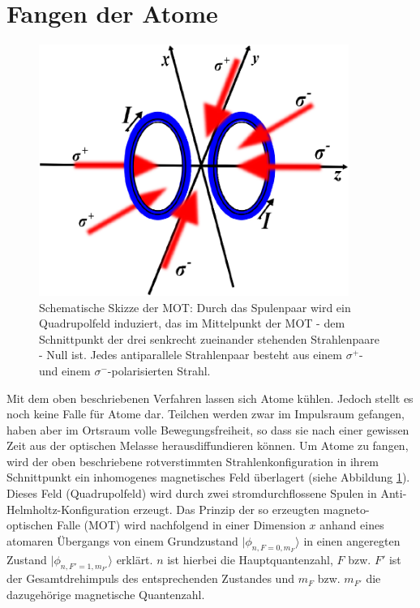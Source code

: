 \documentclass[
class=book,
accentcolor=1b,
custommargins=geometry,
fontsize=11pt,
thesis={type=Versuchsanleitung},
ruledheaders=all,
headline=false,
instbox=false,
marginpar=false,
title=small,
ignore-missing-data=true,
twoside=false,
logofile=apqdesign/tuda_logo.pdf,
pdfa=false %
]{apqpub}
\begin{document}
				\section{Fangen der Atome}	
				\begin{figure}[htb!]
					\centering
					\includegraphics[width=0.9\textwidth]{graphics/MOTSS.jpg}
					\caption{Schematische Skizze der MOT: Durch das Spulenpaar wird ein Quadrupolfeld induziert, das im Mittelpunkt der MOT - dem Schnittpunkt der drei senkrecht zueinander stehenden Strahlenpaare - Null
						ist. Jedes antiparallele Strahlenpaar besteht aus einem $\sigma^+$- und einem $\sigma^-$-polarisierten Strahl.}
					\label{fig:MOTSS}
				\end{figure}	
				Mit dem oben beschriebenen Verfahren lassen sich Atome kühlen. 
				Jedoch stellt es noch keine Falle für Atome dar. 
				Teilchen werden zwar im Impulsraum gefangen, haben aber im Ortsraum volle Bewegungsfreiheit, so dass sie nach einer gewissen Zeit aus der optischen Melasse herausdiffundieren können. 
				Um Atome zu fangen, wird der oben beschriebene rotverstimmten Strahlenkonfiguration in ihrem Schnittpunkt ein inhomogenes magnetisches Feld überlagert (siehe Abbildung \ref{fig:MOTSS}). 
				Dieses Feld (Quadrupolfeld) wird durch zwei stromdurchflossene Spulen in Anti-Helmholtz-Konfiguration erzeugt. 
				Das Prinzip der so erzeugten magneto-optischen Falle (MOT) wird nachfolgend in einer Dimension $x$ anhand eines atomaren Übergangs von einem Grundzustand $\lvert \phi_{n,F=0,m_F}\rangle$ in einen angeregten Zustand $\lvert \phi_{n,F'=1,m_{F'}}\rangle$ erklärt.
				$n$ ist hierbei die Hauptquantenzahl, $F$ bzw. $F'$ ist der Gesamtdrehimpuls des entsprechenden Zustandes und $m_F$ bzw. $m_{F'}$ die dazugehörige magnetische Quantenzahl. 
\end{document}

